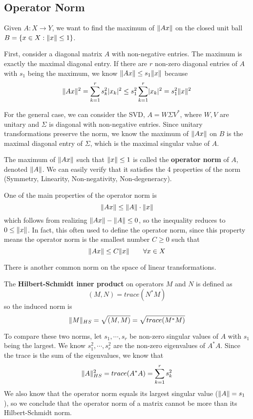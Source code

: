 \subsection{Operator Norm}

Given $A: X \rightarrow Y$, we want to find the maximum of $\lVert Ax\rVert$ on the closed unit ball $B = \{ x \in X : \lVert x\rVert \leq 1 \}$. 

First, consider a diagonal matrix $A$ with non-negative entries. The maximum is exactly the maximal diagonal entry. If there are $r$ non-zero diagonal entries of $A$ with $s_{1}$ being the maximum, we know $\lVert Ax\rVert \leq s_{1} \lVert x\rVert$ because 
$$\lVert Ax\rVert^{2} = \sum_{k=1}^{r} s_{k}^{2} \lvert x_{k}\rvert^{2} \leq s_{1}^{2} \sum_{k=1}^{r} \lvert x_{k}\rvert^{2} = s_{1}^{2} \lVert x\rVert^{2}$$

For the general case, we can consider the SVD, $A = W \Sigma V^{*}$, where $W, V$ are unitary and $\Sigma$ is diagonal with non-negative entries. Since unitary transformations preserve the norm, we know the maximum of $\lVert Ax\rVert$ on $B$ is the maximal diagonal entry of $\Sigma$, which is the maximal singular value of $A$. 

\begin{definition}
The maximum of $\lVert Ax\rVert$ such that $\lVert x\rVert \leq 1$ is called the \textbf{operator norm} of $A$, denoted $\lVert A\rVert$. We can easily verify that it satisfies the 4 properties of the norm (Symmetry, Linearity, Non-negativity, Non-degeneracy). 

One of the main properties of the operator norm is 
$$\lVert Ax\rVert \leq \lVert A\rVert \cdot \lVert x\rVert$$
which follows from realizing $\lVert Ax\rVert - \lVert A\rVert \leq 0$, so the inequality reduces to $0 \leq \lVert x\rVert$. In fact, this often used to define the operator norm, since this property means the operator norm is the smallest number $C \geq 0$ such that 
$$\lVert Ax\rVert \leq C \lVert x\rVert \qquad \forall x \in X$$
\end{definition}

There is another common norm on the space of linear transformations. 

\begin{definition}
The \textbf{Hilbert-Schmidt inner product} on operators $M$ and $N$ is defined as 
$$ (M, N) = trace(N^{*} M)$$
so the induced norm is 
$$\lVert M\rVert_{HS} = \sqrt{(M, M)} = \sqrt{trace(M^{*} M)}$$
\end{definition}

To compare these two norms, let $s_{1}, \cdots, s_{r}$ be non-zero singular values of $A$ with $s_{1}$ being the largest. We know $s_{1}^{2}, \cdots, s_{r}^{2}$ are the non-zero eigenvalues of $A^{*} A$. Since the trace is the sum of the eigenvalues, we know that 
$$\lVert A\rVert_{HS}^{2} = trace(A^{*} A) = \sum_{k=1}^{r} s_{k}^{2}$$
We also know that the operator norm equals its largest singular value ($\lVert A\rVert = s_{1}$), so we conclude that the operator norm of a matrix cannot be more than its Hilbert-Schmidt norm. 

